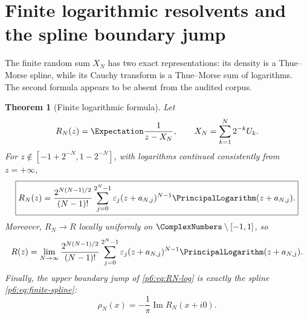 \documentclass[11pt]{article}
\newtheorem{theorem}{Theorem}[section]
\theoremstyle{definition}
\theoremstyle{remark}
\newcommand{\eps}{\varepsilon}
\begin{document}
\section{Finite logarithmic resolvents and the spline boundary jump}

The finite random sum \(X_N\) has two exact representations: its density is a
Thue--Morse spline, while its Cauchy transform is a Thue--Morse sum of logarithms.  The
second formula appears to be absent from the audited corpus.

\begin{theorem}[Finite logarithmic formula]\label{p6:thm:finite-log}
Let
\[
 R_N(z)=\Expectation\frac1{z-X_N},
 \qquad X_N=\sum_{k=1}^{N}2^{-k}U_k.
\]
For \(z\notin[-1+2^{-N},1-2^{-N}]\), with logarithms continued consistently from
\(z=+\infty\),
\begin{equation}
 \boxed{
 R_N(z)=\frac{2^{N(N-1)/2}}{(N-1)!}
 \sum_{j=0}^{2^N-1}\eps_j
 (z+a_{N,j})^{N-1}\PrincipalLogarithm(z+a_{N,j}).
 }                                                           \label{p6:eq:RN-log}
\end{equation}
Moreover, \(R_N\to R\) locally uniformly on \(\ComplexNumbers\setminus[-1,1]\), so
\begin{equation}
 R(z)=\lim_{N\to\infty}\frac{2^{N(N-1)/2}}{(N-1)!}
 \sum_{j=0}^{2^N-1}\eps_j
 (z+a_{N,j})^{N-1}\PrincipalLogarithm(z+a_{N,j}).                           \label{p6:eq:R-log-limit}
\end{equation}
Finally, the upper boundary jump of \eqref{p6:eq:RN-log} is exactly the spline
\eqref{p6:eq:finite-spline}:
\begin{equation}
 \rho_N(x)=-\frac1\pi\operatorname{Im}R_N(x+i0).
                                                                    \label{p6:eq:RN-boundary}
\end{equation}
\end{theorem}
\end{document}
